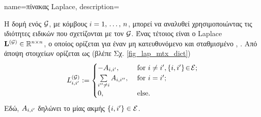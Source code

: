 {name={\foreignlanguage{greek}{πίνακας} Laplace},
	description={\foreignlanguage{greek}{Η δομή ενός}  $\mathcal{G}$,  
		\foreignlanguage{greek}{με κόμβους $i=1, \,\ldots, \,n$, μπορεί να αναλυθεί χρησιμοποιώντας τις ιδιότητες ειδικών}   
		 \foreignlanguage{greek}{που σχετίζονται με τον $\mathcal{G}$. Ένας τέτοιος}  
		\foreignlanguage{greek}{είναι ο}  Laplace  ${\bf L}^{(\mathcal{G})} \in \mathbb{R}^{n \times n}$, 
		\foreignlanguage{greek}{ο οποίος ορίζεται για έναν μη κατευθυνόμενο και σταθμισμένο}  \cite{Luxburg2007}, \cite{Ng2001}. 
		\foreignlanguage{greek}{Από άποψη στοιχείων ορίζεται ως (βλέπε Σχ.} \ref{fig_lap_mtx_dict})
		\begin{equation}
			\nonumber
			L^{(\mathcal{G})}_{i,i'} := \begin{cases} - A_{i,i'}, & \mbox{ for } i\neq i', \{i,i'\}\!\in\!\mathcal{E}; \\ 
			\sum\limits_{i'' \neq i} A_{i,i''}, & \mbox{ for } i = i'; \\ 
							0, & \mbox{ else.} \end{cases}
	 	\end{equation}
  		\foreignlanguage{greek}{Εδώ, $A_{i,i'}$ δηλώνει το}  \foreignlanguage{greek}{μίας 
		ακμής} $\{i,i'\} \in \mathcal{E}$. 
 	 	\begin{figure}[H]
  		\begin{center}
    		\begin{minipage}{0.45\textwidth}
	 	\end{minipage} 
	 	\hspace*{-15mm}
 		\begin{minipage}{0.45\textwidth}
		\centering
	 			\begin{equation} 

\end{equation}
\end{minipage}
\end{center}
\end{figure}}}
